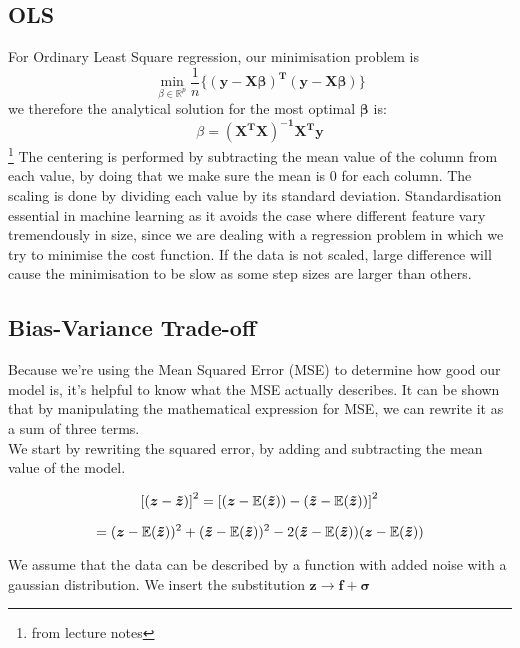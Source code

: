 \documentclass[sigconf, nonacm]{acmart}
\newcommand{\vect}[1]{\boldsymbol{#1}}
\begin{document}
\subsection{OLS}
For Ordinary Least Square regression, our minimisation problem is
\[ \min_{\beta \in \mathbb{R}^{p}} \frac{1}{n}\{ \boldsymbol{(y-X \beta)^{T}(y-X\beta)}\} \] we therefore the analytical solution for the most optimal $ \boldsymbol{\beta} $ is:
\[ \beta = \boldsymbol{(X^{T}X)^{-1}X^{T}y} \] \footnote{from lecture notes}
The centering is performed by subtracting the mean value of the column from each value, by doing that we make sure the mean is $ 0 $ for each column. The scaling is done by dividing each value by its standard deviation. Standardisation essential in machine learning as it avoids the case where different feature vary tremendously in size, since we are dealing with a regression problem in which we try to minimise the cost function. If the data is not scaled, large difference will cause the minimisation to be slow as some step sizes are larger than others.

\subsection{Bias-Variance Trade-off}
Because we're using the Mean Squared Error (MSE) to determine how good our model is, it's helpful to know what the MSE actually describes. It can be shown that by manipulating the mathematical expression for MSE, we can rewrite it as a sum of three terms.\\

We start by rewriting the squared error, by adding and subtracting the mean value of the model.

\begin{equation*}
    \left[(\vect{z} - \vect{\Tilde z})\right]^2 = \left[(\vect{z} -\mathbb{E}(\vect{\Tilde{z}}))  - (\vect{\Tilde z} - \mathbb{E}(\vect{\Tilde{z}}))\right]^2 
\end{equation*}

\begin{equation*}
    = (\vect{z} -\mathbb{E}(\vect{\Tilde{z}}))^2 + (\vect{\Tilde z} - \mathbb{E}(\vect{\Tilde{z}}))^2 - 2(\vect{\Tilde z} - \mathbb{E}(\vect{\Tilde{z}}))(\vect{z} -\mathbb{E}(\vect{\Tilde{z}}))
\end{equation*}


We assume that the data can be described by a function with added noise with a gaussian distribution. We insert the substitution $\vect{z} \to \vect{f} + \vect\sigma$
\end{document}
